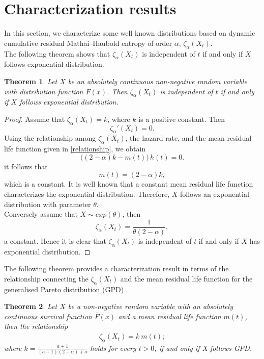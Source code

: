 \documentclass[11pt,reqno]{amsart}
\theoremstyle{tight}
\newtheorem{theorem}{Theorem}[section]
\begin{document}

\section{Characterization results}
In this section, we  characterize some well known distributions based on dynamic cumulative residual Mathai--Haubold entropy of order $\alpha$, $\zeta_{\alpha}(X_t)$.\\
The following theorem shows that $\zeta_{\alpha}(X_t)$ is independent of $t$ if and only if $X$ follows exponential distribution.
\begin{theorem}
  Let $X$ be an absolutely continuous non-negative random variable with distribution function $F(x)$. Then $\zeta_{\alpha}(X_t)$ is independent of $t$ if and only if $X$ follows exponential distribution.
\end{theorem}
\begin{proof}
  Assume that $\zeta_{\alpha}(X_t)=k$, where $k$ is a positive constant. Then
\[
\zeta_{\alpha}'(X_t)=0.
\]
Using the relationship among $\zeta_{\alpha}(X_t)$, the hazard rate, and the mean
residual life function given in \eqref{relationship}, we obtain
\[
\bigl((2-\alpha)k - m(t)\bigr)\,h(t)=0.
\]
 it follows that
\[
m(t)=(2-\alpha)k,
\]
which is a constant. It is well known that a constant mean residual life function
characterizes the exponential distribution. Therefore, $X$ follows an
exponential distribution with parameter $\theta$.
\\  Conversely assume that $X\sim exp(\theta)$, then
  \[
  \zeta_{\alpha}(X_t) = \frac{1}{\theta(2-\alpha)}, \]
a constant. Hence it is clear that $\zeta_{\alpha}(X_t)$ is independent of $t$ if and only if $X$ has exponential distribution.  \end{proof}
  \begin{flushleft}
    The following theorem provides a characterization result in terms of the relationship connecting the $\zeta_{\alpha}(X_t)$ and the mean residual life function for the generalised Pareto distribution (GPD) .
\end{flushleft}
\begin{theorem}
    Let $X$ be a non-negative random variable with an absolutely continuous survival function $\bar{F}(x)$ and a mean residual life function $m(t)$, then the relationship
    \begin{align}\label{thm4.2}
     \zeta_{\alpha}(X_t)=k~m(t);
    \end{align}
    where $k=\frac{a+1}{(a+1)(2-\alpha)+a}$
    holds for every $t>0$, if and only if X follows GPD.
\end{theorem}
\end{document}
